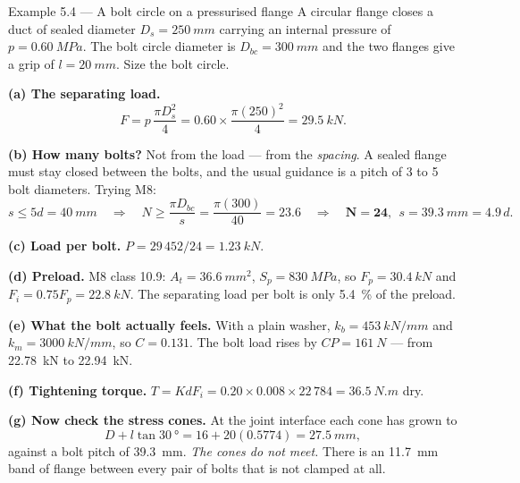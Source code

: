 \documentclass[11pt,a4paper]{article}
\begin{document}
\begin{examplebox}{Example 5.4 --- A bolt circle on a pressurised flange}
A circular flange closes a duct of sealed diameter $D_s=\SI{250}{mm}$ carrying an internal pressure
of $p=\SI{0.60}{MPa}$. The bolt circle diameter is $D_{bc}=\SI{300}{mm}$ and the two flanges give a
grip of $l=\SI{20}{mm}$. Size the bolt circle.

\medskip
\textbf{(a) The separating load.}
\[
F = p\,\frac{\pi D_s^{2}}{4} = 0.60\times\frac{\pi(250)^2}{4} = \SI{29.5}{kN}.
\]

\textbf{(b) How many bolts?} Not from the load --- from the \emph{spacing}. A sealed flange must stay
closed between the bolts, and the usual guidance is a pitch of 3 to 5 bolt diameters. Trying M8:
\[
s \le 5d = \SI{40}{mm}
\quad\Rightarrow\quad
N \ge \frac{\pi D_{bc}}{s} = \frac{\pi(300)}{40}=23.6
\quad\Rightarrow\quad \mathbf{N = 24},\ \ s = \SI{39.3}{mm}=4.9\,d .
\]

\textbf{(c) Load per bolt.} $P = 29\,452/24 = \SI{1.23}{kN}$.

\textbf{(d) Preload.} M8 class 10.9: $A_t=\SI{36.6}{mm^2}$, $S_p=\SI{830}{MPa}$, so
$F_p=\SI{30.4}{kN}$ and $F_i=0.75F_p=\SI{22.8}{kN}$. The separating load per bolt is only
\SI{5.4}{\percent} of the preload.

\textbf{(e) What the bolt actually feels.} With a plain washer, $k_b=\SI{453}{kN/mm}$ and
$k_m=\SI{3000}{kN/mm}$, so $C=0.131$. The bolt load rises by
$C P = \SI{161}{N}$ --- from \SI{22.78}{kN} to \SI{22.94}{kN}.

\textbf{(f) Tightening torque.} $T = K d F_i = 0.20\times0.008\times22\,784 = \SI{36.5}{N.m}$ dry.

\medskip
\begin{center}
\resizebox{0.62\textwidth}{!}{}
\end{center}

\medskip
\textbf{(g) Now check the stress cones.} At the joint interface each cone has grown to
\[
D + l\tan\SI{30}{\degree} = 16 + 20(0.5774) = \SI{27.5}{mm},
\]
against a bolt pitch of \SI{39.3}{mm}. \emph{The cones do not meet.} There is an \SI{11.7}{mm} band
of flange between every pair of bolts that is not clamped at all.
\end{examplebox}
\end{document}
